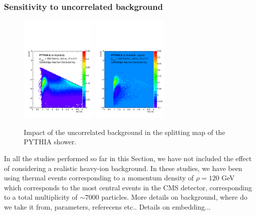 \subsubsection{Sensitivity to uncorrelated background}
\label{sec:uncorrelatedbackground}

\begin{figure}[th]
\centering
\includegraphics[width=0.33\textwidth]
{figures/LundMC/FinalPlots/PythiaEmb_CA.pdf}%
\includegraphics[width=0.33\textwidth]
{figures/LundMC/FinalPlots/PythiaDiff_CA.pdf}%
\caption{Impact of the uncorrelated background in the splitting map of the PYTHIA shower.}
\label{fig:UncorrelatedBkg}
\end{figure}

In all the studies performed so far in this Section, we have not included the effect of considering a realistic heavy-ion background. In these studies, we have been using thermal events corresponding to a momentum density of $\rho =120$ GeV which corresponds to the most central events in the CMS detector, corresponding to a total multiplicity of $\sim 7000$ particles. 
{\color{red} More details on background, where do we take it from, parameters,  referecens etc.. Details on embedding...}

